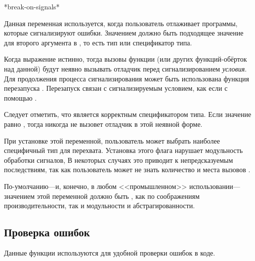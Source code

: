 \begin{defun}[Переменная]
*break-on-signals*

Данная переменная используется, когда пользователь отлаживает программы, которые
сигнализируют ошибки. Значением  должно быть подходящее
значение для второго аргумента в , то есть тип или спецификатор типа.

Когда выражение  истинно, тогда
вызовы функции  (или других функций-обёрток над данной) будут неявно
вызывать отладчик перед сигнализированием \emph{условия}. Для продолжения
процесса сигнализирования может быть использована функция перезапуска
. Перезапуск связан с сигнализируемым условием, как если с помощью
.

Следует отметить, что  является корректным спецификатором типа. Если
значение  равно , тогда  никогда не
вызовет отладчик в этой неявной форме.

При установке этой переменной, пользователь может выбрать наиболее специфичный
тип для перехвата. Установка этого флага нарушает модульность обработки
сигналов, В некоторых случаях это приводит к непредсказуемым последствиям, так
как пользователь может не знать количество и места вызовов .

По-умолчанию---и, конечно, в любом <<промышленном>> использовании---значением
этой переменной должно быть , как по соображениям производительности,
так и модульности и абстрагированности. 
\end{defun}


\subsection{Проверка ошибок}
\label{CONDITION-ASSERTIONS}

Данные функции используются для удобной проверки ошибок в коде.

